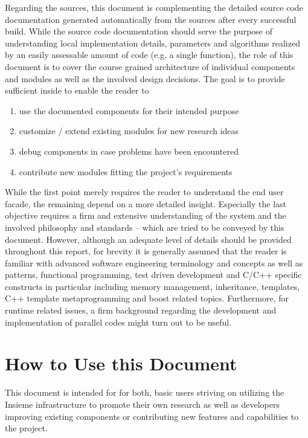 Regarding the sources, this document is complementing the detailed source code
documentation \cite{insieme_source_doc} generated automatically from the sources
after every successful build. While the source code documentation should serve
the purpose of understanding local implementation details, parameters and
algorithms realized by an easily assessable amount of code (e.g. a single
function), the role of this document is to cover the course grained architecture
of individual components and modules as well as the involved design decisions.
The goal is to provide sufficient inside to enable the reader to

\begin{enumerate}
  \item use the documented components for their intended purpose
  \item customize / extend existing modules for new research ideas
  \item debug components in case problems have been encountered
  \item contribute new modules fitting the project's requirements
\end{enumerate}

While the first point merely requires the reader to understand the end user
facade, the remaining depend on a more detailed insight. Especially the last
objective requires a firm and extensive understanding of the system and the
involved philosophy and standards -- which are tried to be conveyed by this
document. However, although an adequate level of details should be provided
throughout this report, for brevity it is generally assumed that the reader is
familiar with advanced software engineering terminology and concepts as well as
patterns, functional programming, test driven development and C/C++ specific
constructs in particular including memory management, inheritance, templates,
C++ template metaprogramming and boost related topics. Furthermore, for runtime
related issues, a firm background regarding the development and
implementation of parallel codes might turn out to be useful.

\section{How to Use this Document}
This document is intended for for both, basic users striving on utilizing the
Insieme infrastructure to promote their own research as well as developers
improving existing components or contributing new features and capabilities to
the project.

